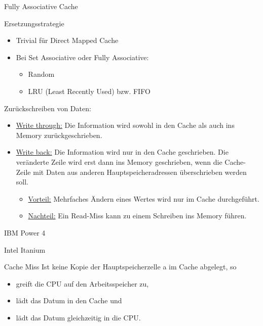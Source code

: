 \begin{defi}{Fully Associative Cache}
    
\end{defi}

\begin{defi}{Ersetzungsstrategie}
    \begin{itemize}
        \item Trivial für Direct Mapped Cache
        \item Bei Set Associative oder Fully Associative:
              \begin{itemize}
                  \item Random
                  \item LRU (Least Recently Used) bzw. FIFO
              \end{itemize}
    \end{itemize}
    Zurückschreiben von Daten:
    \begin{itemize}
        \item \underline{Write through:} Die Information wird sowohl in den Cache als auch ins
              Memory zurückgeschrieben.
        \item \underline{Write back:} Die Information wird nur in den Cache geschrieben. Die
              veränderte Zeile wird erst dann ins Memory geschrieben, wenn die
              Cache-Zeile mit Daten aus anderen Hauptspeicheradressen
              überschrieben werden soll.
              \begin{itemize}
                  \item \underline{Vorteil:} Mehrfaches Ändern eines Wertes wird nur im Cache durchgeführt.
                  \item \underline{Nachteil:} Ein Read-Miss kann zu einem Schreiben ins Memory führen.
              \end{itemize}
    \end{itemize}
\end{defi}

\begin{bonus}[Cache]{IBM Power 4}
    
\end{bonus}

\begin{bonus}[Cache]{Intel Itanium}
    
\end{bonus}

\begin{defi}{Cache Miss}
    Ist keine Kopie der Hauptspeicherzelle a im Cache abgelegt, so 
    \begin{itemize}
        \item greift die CPU auf den Arbeitsspeicher zu,
        \item lädt das Datum in den Cache und
        \item lädt das Datum gleichzeitig in die CPU.
    \end{itemize}
\end{defi}

